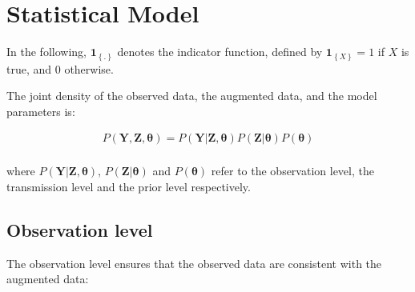 \documentclass[10pt]{article}
\begin{document}
\section*{Statistical Model}

In the following, $\mathbf{1}_{\left\lbrace.\right\rbrace}$ denotes the indicator function, defined by $\mathbf{1}_{\left\lbrace X \right\rbrace}=1$ if $X$ is true, and $0$ otherwise.

The joint density of the observed data, the augmented data, and the model parameters is: 

\begin{equation} \label {JointDensity}
\begin{split}
P\left(\bm{Y},\bm{Z},\bm{\theta}\right) = P\left(\bm{Y}|\bm{Z},\bm{\theta}\right)P\left(\bm{Z}|\bm{\theta}\right)P\left(\bm{\theta}\right)\\ \nonumber
\end{split}
\end{equation}

\noindent where $P\left(\bm{Y}|\bm{Z},\bm{\theta}\right)$, $P\left(\bm{Z}|\bm{\theta}\right)$ 
and $P\left(\bm{\theta}\right)$ refer to the observation level, the transmission level
 and the prior level respectively.


\subsection*{Observation level}


The observation level ensures that the observed data are consistent with the augmented data:
\end{document}
